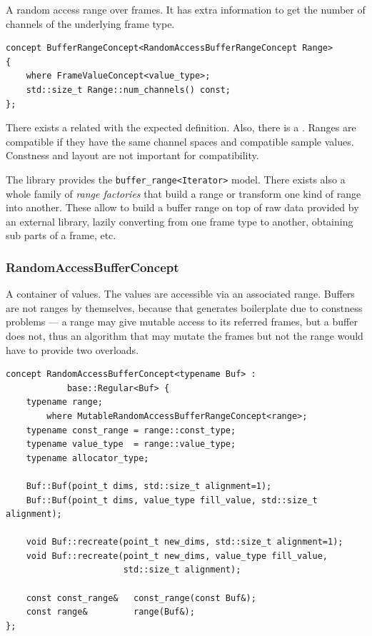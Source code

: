 A random access range over frames. It has extra information to get the
number of channels of the underlying frame type.

\begin{lstlisting}
concept BufferRangeConcept<RandomAccessBufferRangeConcept Range> 
{
    where FrameValueConcept<value_type>;
    std::size_t Range::num_channels() const;
};
\end{lstlisting}

There exists a related  with the
expected definition. Also, there is a
. Ranges are compatible if they
have the same channel spaces and compatible sample values. Constness
and layout are not important for compatibility.

The library provides the
\texttt{buffer\_range<Iterator>} model. There exists also a whole
family of \emph{range factories} that build a range or transform one
kind of range into another. These allow to build a buffer range on
top of raw data provided by an external library, lazily converting
from one frame type to another, obtaining sub parts of a frame, etc.

\subsubsection{RandomAccessBufferConcept}

A container of values. The values are accessible via an associated
range. Buffers are not ranges by themselves, because that generates
boilerplate due to constness problems --- a  range may
give mutable access to its referred frames, but a  buffer
does not, thus an algorithm that may mutate the frames but not the
range would have to provide two overloads.

\begin{lstlisting}
concept RandomAccessBufferConcept<typename Buf> : 
            base::Regular<Buf> {
    typename range; 
        where MutableRandomAccessBufferRangeConcept<range>;
    typename const_range = range::const_type;
    typename value_type  = range::value_type;
    typename allocator_type;

    Buf::Buf(point_t dims, std::size_t alignment=1);
    Buf::Buf(point_t dims, value_type fill_value, std::size_t alignment);
    
    void Buf::recreate(point_t new_dims, std::size_t alignment=1);
    void Buf::recreate(point_t new_dims, value_type fill_value,
                       std::size_t alignment);
    
    const const_range&   const_range(const Buf&);
    const range&         range(Buf&);
};
\end{lstlisting}

